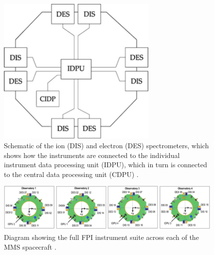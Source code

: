 \begin{figure}
    \centering
    \includegraphics[width=0.7\textwidth]{Figures//Instrumentation/Torbert_Figure4.png}
    \caption[Schematic of DIS and DES instruments aboard MMS]{Schematic of the ion (DIS) and electron (DES) spectrometers, which shows how the instruments are connected to the individual instrument data processing unit (IDPU), which in turn is connected to the central data processing unit (CDPU) \citep{Pollock:2016}.} 
    \label{fig:fpi-mms-schematic}
\end{figure}

\begin{figure}
    \centering
    \includegraphics[width=\textwidth]{Figures//Instrumentation/Pollock_Figure5.jpg}
    \caption[MMS FPI instrument suite]{Diagram showing the full FPI instrument suite across each of the MMS spacecraft \citep{Pollock:2016}.}
    \label{fig:fpi-mms}
\end{figure}

